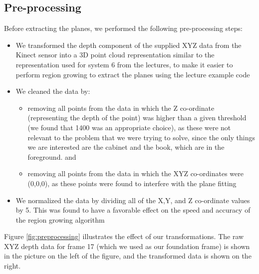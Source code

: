 \subsection{Pre-processing}
Before extracting the planes, we performed the following pre-processing steps:

\begin{itemize}
	\item We transformed the depth component of the supplied XYZ data from the Kinect sensor into a 3D point cloud representation similar to the representation used for system 6 from the lectures, to make it easier to perform region growing to extract the planes using the lecture example code
	\item We cleaned the data by:
		\begin{itemize}
			\item removing all points from the data in which the Z co-ordinate (representing the depth of the point) was higher than a given threshold (we found that 1400 was an appropriate choice), as these were not relevant to the problem that we were trying to solve, since the only things we are interested are the cabinet and the book, which are in the foreground. and
			\item removing all points from the data in which the XYZ co-ordinates were (0,0,0), as these points were found to interfere with the plane fitting
		\end{itemize}
	\item We normalized the data by dividing all of the X,Y, and Z co-ordinate values by 5. This was found to have a favorable effect on the speed and accuracy of the region growing algorithm
\end{itemize}

Figure \ref{fig:preprocessing} illustrates the effect of our transformations. The raw XYZ depth data for frame 17 (which we used as our foundation frame) is shown in the picture on the left of the figure, and the transformed data is shown on the right.




